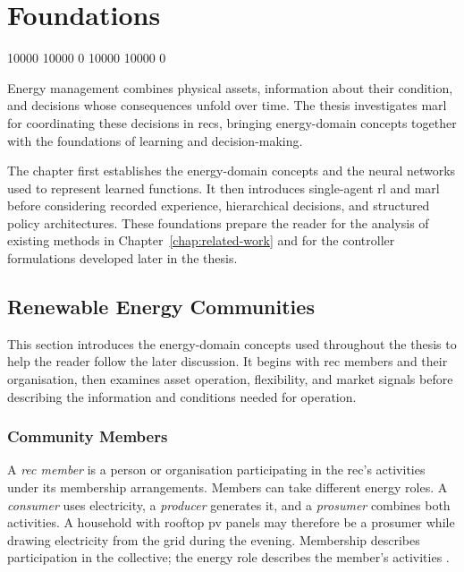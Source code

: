 \chapter{Foundations}
\label{chap:foundations}
\begingroup
{}
 10000 10000 0
 10000 10000 0
\raggedbottom

Energy management combines physical assets, information about their condition, and decisions whose consequences unfold over time. The thesis investigates \gls{marl} for coordinating these decisions in \glspl{rec}, bringing energy-domain concepts together with the foundations of learning and decision-making.

The chapter first establishes the energy-domain concepts and the neural networks used to represent learned functions. It then introduces single-agent \gls{rl} and \gls{marl} before considering recorded experience, hierarchical decisions, and structured policy architectures. These foundations prepare the reader for the analysis of existing methods in Chapter~\ref{chap:related-work} and for the controller formulations developed later in the thesis.

\FloatBarrier
\section{Renewable Energy Communities}
\label{sec:ch2-rec}

This section introduces the energy-domain concepts used throughout the thesis to help the reader follow the later discussion. It begins with \gls{rec} members and their organisation, then examines asset operation, flexibility, and market signals before describing the information and conditions needed for operation.

\subsection{Community Members}
\label{sec:ch2-rec-members}
\label{sec:ch2-community-structure}

A \emph{\gls{rec} member} is a person or organisation participating in the \gls{rec}'s activities under its membership arrangements. Members can take different energy roles. A \emph{consumer} uses electricity, a \emph{producer} generates it, and a \emph{prosumer} combines both activities. A household with rooftop \gls{pv} panels may therefore be a prosumer while drawing electricity from the grid during the evening. Membership describes participation in the collective; the energy role describes the member's activities \parencite{reis2021businessmodels}.

